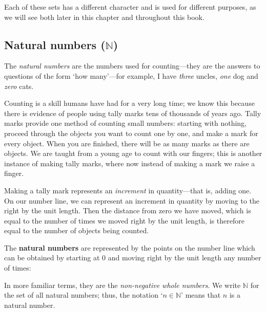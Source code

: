 Each of these sets has a different character and is used for different purposes, as we will see both later in this chapter and throughout this book.

\subsection*{Natural numbers ($\mathbb{N}$)}

The \textit{natural numbers} are the numbers used for counting---they are the answers to questions of the form `how many'---for example, I have \textit{three} uncles, \textit{one} dog and \textit{zero} cats.

Counting is a skill humans have had for a very long time; we know this because there is evidence of people using tally marks tens of thousands of years ago. Tally marks provide one method of counting small numbers: starting with nothing, proceed through the objects you want to count one by one, and make a mark for every object. When you are finished, there will be as many marks as there are objects. We are taught from a young age to count with our fingers; this is another instance of making tally marks, where now instead of making a mark we raise a finger.

Making a tally mark represents an \textit{increment} in quantity---that is, adding one. On our number line, we can represent an increment in quantity by moving to the right by the unit length. Then the distance from zero we have moved, which is equal to the number of times we moved right by the unit length, is therefore equal to the number of objects being counted.

\begin{definition}
\label{defNaturalNumbersInformal}
The \textbf{natural numbers} are represented by the points on the number line which can be obtained by starting at $0$ and moving right by the unit length any number of times:
\begin{center}
\end{center}
In more familiar terms, they are the \textit{non-negative whole numbers}. We write $\mathbb{N}$  for the set of all natural numbers; thus, the notation `$n \in \mathbb{N}$' means that $n$ is a natural number.
\end{definition}

